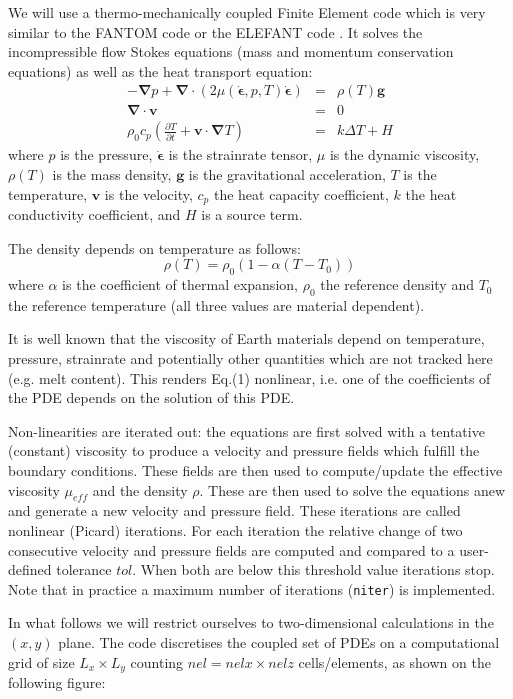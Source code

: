 \documentclass[a4paper]{article}
\begin{document}
We will use a thermo-mechanically coupled Finite Element code which is very similar to the FANTOM code  \cite{thie11} or the ELEFANT code \cite{latb17}. It solves the incompressible flow Stokes equations (mass and momentum conservation equations) as well as the heat transport equation:
\begin{eqnarray}
-{\bm \nabla}p + {\bm \nabla} \cdot (2\mu(\dot{\bm \epsilon},p,T)\dot{\bm \epsilon}) &=& \rho(T) {\bm g} \\
{\bm \nabla}\cdot {\bm v} &=& 0 \\
\rho_0 c_p \left(\frac{\partial T}{\partial t} + {\bm v}\cdot{\bm \nabla} T \right) &=& k \Delta T +H
\end{eqnarray}
where $p$ is the pressure, $\dot{\bm \epsilon}$ is the strainrate tensor, $\mu$ is the dynamic viscosity, $\rho(T)$ is the mass density, ${\bm g}$ is the gravitational acceleration, $T$ is the temperature, ${\bm v}$ is the velocity, $c_p$ the heat capacity coefficient, $k$ the heat conductivity coefficient, and $H$ is a source term.

The density depends on temperature as follows:
\[
\rho(T) = \rho_0 (1-\alpha(T-T_0))
\]
where $\alpha$ is the coefficient of thermal expansion, $\rho_0$ the reference density and $T_0$ the reference temperature
(all three values are material dependent).

It is well known that the viscosity of Earth materials depend on temperature, pressure, strainrate and potentially other quantities which are not tracked here (e.g. melt content). This renders Eq.(1) nonlinear, i.e. one of the coefficients of the PDE depends on the solution of this PDE. 

Non-linearities are iterated out: the equations are first solved with a tentative (constant) viscosity to produce a velocity and pressure fields which fulfill the boundary conditions. These fields are then used to compute/update the effective viscosity $\mu_{eff}$ and the density $\rho$. These are then used to solve the equations anew and generate a new velocity and pressure field. These iterations are called nonlinear (Picard) iterations. For each iteration the relative change of two consecutive velocity and pressure  fields are computed and compared to a user-defined tolerance $tol$. When both are below this threshold value iterations stop. Note that in practice a maximum number of iterations ({\tt niter}) is implemented.

In what follows we will restrict ourselves to two-dimensional calculations in the $(x,y)$ plane. 
The code discretises the coupled set of PDEs on a computational grid of size $L_x\times L_y$ counting $nel=nelx \times nelz$ cells/elements, as shown on the following figure:
\end{document}
